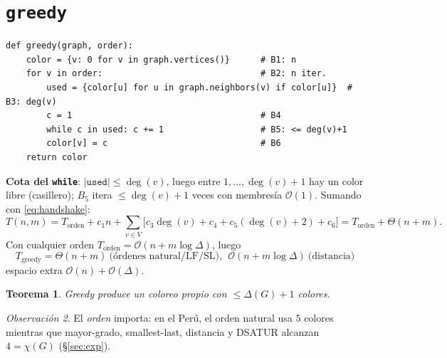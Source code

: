 \documentclass[11pt,a4paper]{article}
\newtheorem{teorema}{Teorema}[section]
\theoremstyle{definition}
\theoremstyle{remark}
\newtheorem{observacion}[teorema]{Observación}
\newcommand{\dg}{\operatorname{deg}}
\newcommand{\bigO}{\mathcal{O}}
\begin{document}
\section{\texttt{greedy}}\label{sec:greedy}
\begin{lstlisting}
def greedy(graph, order):
    color = {v: 0 for v in graph.vertices()}      # B1: n
    for v in order:                               # B2: n iter.
        used = {color[u] for u in graph.neighbors(v) if color[u]}  # B3: deg(v)
        c = 1                                     # B4
        while c in used: c += 1                   # B5: <= deg(v)+1
        color[v] = c                              # B6
    return color
\end{lstlisting}
\textbf{Cota del \texttt{while}}: $|\texttt{used}|\le\dg(v)$, luego entre
$1,\dots,\dg(v){+}1$ hay un color libre (casillero); $B_5$ itera $\le\dg(v)+1$
veces con membresía $\bigO(1)$. Sumando con \eqref{eq:handshake}:
\[
T(n,m)=T_{\text{orden}}+c_1 n+\sum_{v\in V}\big[c_3\dg(v)+c_4+c_5(\dg(v){+}2)+c_6\big]
=T_{\text{orden}}+\Theta(n+m).
\]
Con cualquier orden $T_{\text{orden}}=\bigO(n+m\log\Delta)$, luego
\[
\boxed{\,T_{\text{greedy}}=\Theta(n+m)\ \text{(órdenes natural/LF/SL)},\ \
\bigO(n+m\log\Delta)\ \text{(distancia)}\,}
\]
espacio extra $\bigO(n)+\bigO(\Delta)$.
\begin{teorema}
Greedy produce un coloreo propio con $\le\Delta(G)+1$ colores.
\end{teorema}
\begin{observacion}
El \emph{orden} importa: en el Perú, el orden natural usa $5$ colores mientras que
mayor-grado, smallest-last, distancia y DSATUR alcanzan $4=\chi(G)$ (\S\ref{sec:exp}).
\end{observacion}

\end{document}

